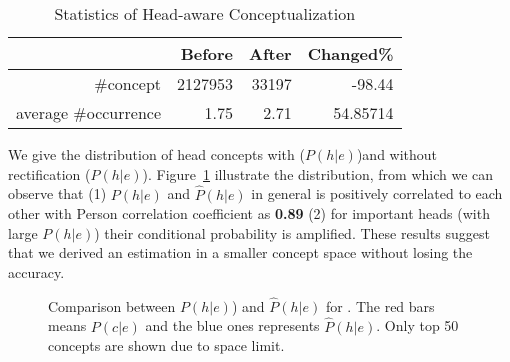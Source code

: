 \begin{table}[htbp]
\vspace{-4mm}
  \centering
  \caption{Statistics of Head-aware Conceptualization}
  \small
    \begin{tabular}{rrrr}
    \toprule
          & Before & After & Changed\% \\
    \midrule
    \#concept & 2127953 & 33197 & -98.44 \\
    average \#occurrence & 1.75  & 2.71  & 54.85714 \\
    \bottomrule
    \end{tabular}%
  \label{tab:nhc}%
\end{table}%


We give the distribution of head concepts with ($P(h|e)$)and without rectification ($\hat{P}(h|e)$).  Figure~\ref{fig:hac} illustrate the distribution, from which we can observe that (1) $P(h|e)$ and $\hat{P}(h|e)$ in general is positively correlated to each other with Person correlation coefficient as {\bf 0.89} (2) for important heads (with large $P(h|e)$) their conditional probability is amplified. These results suggest that we derived an estimation in a smaller concept space without losing the accuracy.


\begin{figure}[!tb]
\centering
\small
{}
\vspace{-8mm}
\caption{Comparison between $P(h|e)$) and $\hat{P}(h|e)$ for . \small The red bars means $P(c|e)$ and the blue ones represents $\hat{P}(h|e)$. Only top 50 concepts are shown due to space limit.  }
\label{fig:hac}
\vspace{-6mm}
\vspace{-6mm}
\end{figure}

